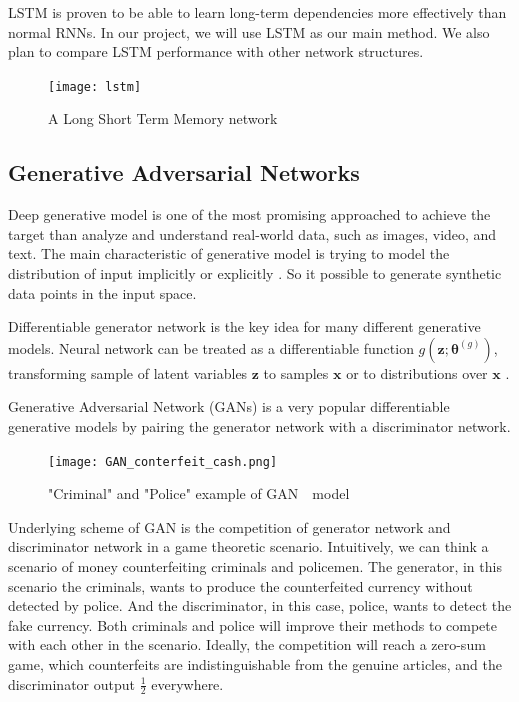 LSTM is proven to be able to learn long-term dependencies more effectively than normal RNNs. In our project, we will use LSTM as our main method. We also plan to compare LSTM performance with other network structures.
\begin{figure}[htb]
	\centering
	\texttt{[image: lstm]}
	\caption{A Long Short Term Memory network}
	\label{fig:lstm}
\end{figure} 

\subsection{Generative Adversarial Networks}
Deep generative model is one of the most promising approached to achieve the target than analyze and understand real-world data, such as images, video, and text. The main characteristic of generative model is trying to model the distribution of input implicitly or explicitly \cite{christopher2006prml}. So it possible to generate synthetic data points in the input space.

Differentiable generator network is the key idea for many different generative models. Neural network can be treated as a differentiable function $ g(\bm{z};\bm{\theta}^{(g)}) $, transforming sample of latent variables $ \mathbf{z} $ to samples $ \mathbf{x} $ or to distributions over $ \mathbf{x} $ \cite{goodfellow2016deeplearning}.

Generative Adversarial Network (GANs) \cite{goodfellow2014gan} is a very popular differentiable generative models by pairing the generator network with a discriminator network.

\begin{figure}[htbp]
    \centering
    \texttt{[image: GAN\_conterfeit\_cash.png]}
    \caption{"Criminal" and "Police" example of GAN　model}
    \label{fig:GANcash}
\end{figure}




Underlying scheme of GAN is the competition of generator network and discriminator network in a game theoretic scenario. Intuitively, we can think a scenario of money counterfeiting criminals and policemen. The generator, in this scenario the criminals, wants to produce the counterfeited currency without detected by police. And the discriminator, in this case, police, wants to detect the fake currency. Both criminals and police will improve their methods to compete with each other in the scenario. Ideally,  the competition will reach a zero-sum game, which counterfeits are indistinguishable from the genuine articles, and the discriminator output $ \frac{1}{2} $ everywhere.
 
